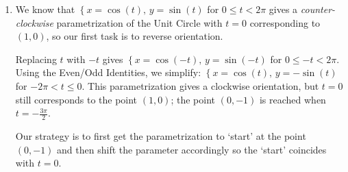 \documentclass{ximera}
\begin{document}
\begin{example}
\begin{enumerate}
 

 Since the first parametrization leaves off at $t=1$, we shift the parameter in the second part so it starts at $t=1$.  Our current description of the second part starts at $t=0$, so we need to introduce a `time delay' of $1$ unit to the second set of parametric equations.  
 
  
 
 Replacing $t$ with $(t-1)$ in the second set of  equations gives $\left\{ x = 3 + 2(t-1), \, y = 4 - 4(t-1) \right.$ for $0 \leq t-1 \leq 1$.   Simplifying yields $\left\{ x = 1+2t, \, y = 8  -4t \right.$ for $1 \leq t \leq 2$. Hence, we may parametrize the path as $\left\{ x = f(t), \, y = g(t) \right.$ for $0 \leq t \leq 2$ where

\[ \begin{array}{ccc}

f(t) = \left\{ \begin{array}{rl} 3t, & \text{for $0 \leq t \leq 1$} \\ 1+2t, & \text{for $1 \leq t \leq 2$} \end{array} \right. & \text{and} &  g(t) = \left\{ \begin{array}{rl} 4t, & \text{for $0 \leq t \leq 1$} \\ 8-4t, & \text{for $1 \leq t \leq 2$} \end{array} \right. \\

\end{array}\]

Again, we encourage the reader to check our solution.

\item  We know that $\left\{ x = \cos(t), \, y = \sin(t) \right.$ for $0 \leq t < 2\pi$ gives a \textit{counter-clockwise} parametrization of the Unit Circle with $t = 0$ corresponding to $(1,0)$, so our first task is to reverse  orientation.  

 

Replacing $t$ with $-t$ gives $\left\{ x = \cos(-t), \, y = \sin(-t) \right.$ for $0 \leq -t < 2\pi$.  Using the Even/Odd Identities, we simplify: $\left\{ x = \cos(t), \, y = -\sin(t) \right.$ for  $-2\pi <  t \leq  0$.  This parametrization gives a clockwise orientation, but $t=0$ still corresponds to the point $(1,0)$; the point $(0, -1)$ is reached when $t = -\frac{3\pi}{2}$.  

 

Our strategy is to first get the parametrization to `start' at the point $(0,-1)$ and then shift the parameter accordingly so the `start' coincides with $t = 0$.  


\end{enumerate}
\end{example}
\end{document}
